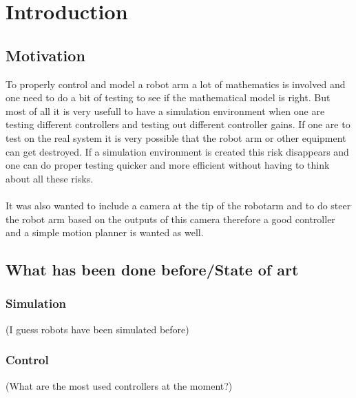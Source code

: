 \chapter{Introduction}
\section{Motivation}
To properly control and model a robot arm a lot of mathematics is involved and one need to do a bit of testing to see if the mathematical model is right. But most of all it is very usefull to have a simulation environment when one are testing different controllers and testing out different controller gains. If one are to test on the real system it is very possible that the robot arm or other equipment can get destroyed. If a simulation environment is created this risk disappears and one can do proper testing quicker and more efficient without having to think about all these risks. \\ \\
It was also wanted to include a camera at the tip of the robotarm and to do steer the robot arm based on the outputs of this camera therefore a good controller and a simple motion planner is wanted as well. 

\section{What has been done before/State of art}
\subsection{Simulation}
(I guess robots have been simulated before)
\subsection{Control}
(What are the most used controllers at the moment?)